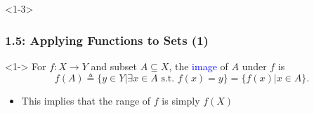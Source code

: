 \documentclass[10pt,english,aspectratio=169,handout]{beamer}
\begin{document}
\begin{frame}<1-3> \frametitle{1.5: Applying Functions to Sets (1)}

\vspace{1mm}
\begin{definition}<1->
For $f \colon X\rightarrow Y$ and subset $A\subseteq X$, the \textcolor{blue}{image} of $A$ under $f$ is \vspace{-2mm}
\[ f(A) \triangleq \{ y\in Y | \exists x\in A \textrm{ s.t. } f(x)=y\} = \{f(x) | x\in A\}. \]
\end{definition}

\begin{center}
\end{center}

\begin{itemize}
  \setlength\itemsep{2mm}
  \item<3-> This implies that the range of $f$ is simply $f(X)$
\end{itemize}


\end{frame}  
\end{document}
